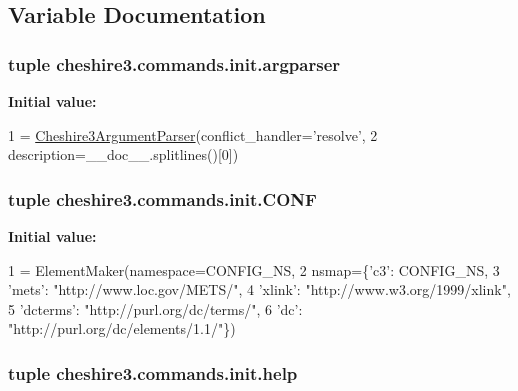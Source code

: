 \subsection{Variable Documentation}
\hypertarget{namespacecheshire3_1_1commands_1_1init_a918e125800852a4cbc242344a0c5a778}{
\subsubsection[{argparser}]{\setlength{\rightskip}{0pt plus 5cm}tuple cheshire3.\-commands.\-init.\-argparser}}\label{namespacecheshire3_1_1commands_1_1init_a918e125800852a4cbc242344a0c5a778}
{\bfseries Initial value\-:}
\begin{DoxyCode}
1 = \hyperlink{classcheshire3_1_1commands_1_1cmd__utils_1_1_cheshire3_argument_parser}{Cheshire3ArgumentParser}(conflict\_handler=\textcolor{stringliteral}{'resolve'},
2                                     description=\_\_doc\_\_.splitlines()[0])
\end{DoxyCode}
\hypertarget{namespacecheshire3_1_1commands_1_1init_a1bd382f7e207d5ff49b5d11b74324578}{
\subsubsection[{C\-O\-N\-F}]{\setlength{\rightskip}{0pt plus 5cm}tuple cheshire3.\-commands.\-init.\-C\-O\-N\-F}}\label{namespacecheshire3_1_1commands_1_1init_a1bd382f7e207d5ff49b5d11b74324578}
{\bfseries Initial value\-:}
\begin{DoxyCode}
1 = ElementMaker(namespace=CONFIG\_NS,
2                     nsmap=\{\textcolor{stringliteral}{'c3'}: CONFIG\_NS,
3                            \textcolor{stringliteral}{'mets'}: \textcolor{stringliteral}{"http://www.loc.gov/METS/"},
4                            \textcolor{stringliteral}{'xlink'}: \textcolor{stringliteral}{"http://www.w3.org/1999/xlink"},
5                            \textcolor{stringliteral}{'dcterms'}: \textcolor{stringliteral}{"http://purl.org/dc/terms/"},
6                            \textcolor{stringliteral}{'dc'}: \textcolor{stringliteral}{"http://purl.org/dc/elements/1.1/"}\})
\end{DoxyCode}
\hypertarget{namespacecheshire3_1_1commands_1_1init_a9f54829846c8f241e0a155293b79e266}{
\subsubsection[{help}]{\setlength{\rightskip}{0pt plus 5cm}tuple cheshire3.\-commands.\-init.\-help}}\label{namespacecheshire3_1_1commands_1_1init_a9f54829846c8f241e0a155293b79e266}
